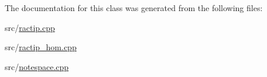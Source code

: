 The documentation for this class was generated from the following files\+:\begin{DoxyCompactItemize}
\item 
src/\hyperlink{ractip_8cpp}{ractip.\+cpp}\item 
src/\hyperlink{ractip__hom_8cpp}{ractip\+\_\+hom.\+cpp}\item 
src/\hyperlink{notespace_8cpp}{notespace.\+cpp}\end{DoxyCompactItemize}
